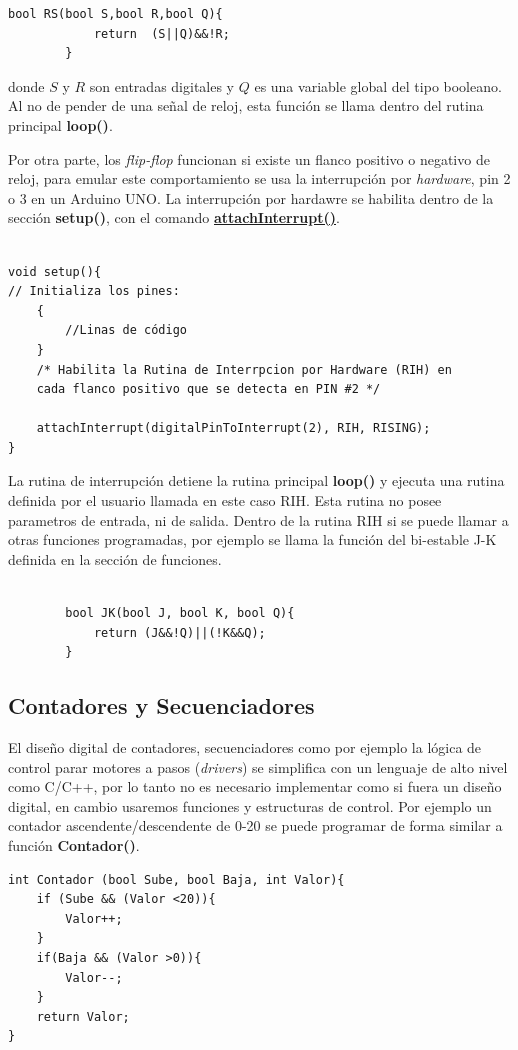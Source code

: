 		 \begin{lstlisting}[language=Arduino,numbers=none, showstringspaces=false]
		bool RS(bool S,bool R,bool Q){
			return  (S||Q)&&!R;
		}
		\end{lstlisting} donde $S$ y $R$ son entradas digitales y $Q$ es una variable global del tipo booleano. Al no de pender de una señal de reloj, esta función se llama dentro del rutina principal \textbf{loop()}.

Por otra parte, los \textit{flip-flop} funcionan si existe un flanco positivo o negativo de reloj, para emular este comportamiento se usa  la interrupción por \textit{hardware}, pin 2 o 3  en un Arduino UNO. La interrupción por hardawre se habilita dentro de la sección \textbf{setup()}, con el comando \href{https://reference.arduino.cc/reference/en/language/functions/external-interrupts/attachinterrupt/}{ \textbf{attachInterrupt()}}.

	\begin{lstlisting}[language=Arduino,numbers=none, showstringspaces=false]

void setup(){
// Initializa los pines:
	{
		//Linas de código
	}	
	/* Habilita la Rutina de Interrpcion por Hardware (RIH) en
	cada flanco positivo que se detecta en PIN #2 */
	
	attachInterrupt(digitalPinToInterrupt(2), RIH, RISING);
}
\end{lstlisting}

La rutina de interrupción detiene la rutina principal \textbf{loop()} y ejecuta una rutina definida por el usuario llamada en este caso RIH. Esta rutina no posee parametros de entrada, ni de salida. Dentro de la rutina  RIH si se puede llamar a otras funciones programadas, por ejemplo se llama la función del bi-estable J-K definida en la sección de funciones. 


		\begin{lstlisting}[language=Arduino,numbers=none, showstringspaces=false]
		
		bool JK(bool J, bool K, bool Q){
			return (J&&!Q)||(!K&&Q);
		}
		\end{lstlisting}

\subsection{Contadores y Secuenciadores}


El diseño digital de contadores, secuenciadores como por ejemplo la lógica de control parar motores a pasos (\textit{drivers}) se simplifica con un lenguaje de alto nivel como C/C++, por lo tanto no es necesario implementar como si fuera un diseño digital, en cambio usaremos funciones y estructuras de control. Por ejemplo un contador ascendente/descendente de 0-20 se puede programar de forma similar a función \textbf{Contador()}.
\begin{lstlisting}[language=Arduino,numbers=none, showstringspaces=false]
int Contador (bool Sube, bool Baja, int Valor){
	if (Sube && (Valor <20)){
		Valor++;
	}
	if(Baja && (Valor >0)){
		Valor--;
	}
	return Valor;
}
\end{lstlisting}
 
